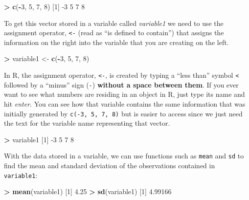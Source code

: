 \documentclass[]{book}
\newenvironment{Shaded}{\begin{snugshade}}{\end{snugshade}}
\newcommand{\DecValTok}[1]{\textcolor[rgb]{0.00,0.00,0.81}{#1}}
\newcommand{\FloatTok}[1]{\textcolor[rgb]{0.00,0.00,0.81}{#1}}
\newcommand{\KeywordTok}[1]{\textcolor[rgb]{0.13,0.29,0.53}{\textbf{#1}}}
\newcommand{\NormalTok}[1]{#1}
\newcommand{\OperatorTok}[1]{\textcolor[rgb]{0.81,0.36,0.00}{\textbf{#1}}}
\newcommand{\StringTok}[1]{\textcolor[rgb]{0.31,0.60,0.02}{#1}}
\renewenvironment{Shaded}{%
\setlength{\FrameRule}{1.5pt}
\def\FrameCommand{\fboxrule=\FrameRule\fboxsep=5pt 
                  \fcolorbox{framecolor}{shadecolor}}%
\MakeFramed {\FrameRestore}}%
{\endMakeFramed}
\begin{document}
\begin{Shaded}
\begin{Highlighting}[]
\OperatorTok{>}\StringTok{ }\KeywordTok{c}\NormalTok{(}\OperatorTok{-}\DecValTok{3}\NormalTok{, }\DecValTok{5}\NormalTok{, }\DecValTok{7}\NormalTok{, }\DecValTok{8}\NormalTok{)}
\NormalTok{[}\DecValTok{1}\NormalTok{] }\DecValTok{-3} \DecValTok{5} \DecValTok{7} \DecValTok{8}
\end{Highlighting}
\end{Shaded}

To get this vector stored in a variable called \emph{variable1} we need to
use the assignment operator, \texttt{\textless{}-} (read as ``is defined to contain'') that assigns
the information on the right into the variable that you are creating on
the left.

\begin{Shaded}
\begin{Highlighting}[]
\OperatorTok{>}\StringTok{ }\NormalTok{variable1 <-}\StringTok{ }\KeywordTok{c}\NormalTok{(}\OperatorTok{-}\DecValTok{3}\NormalTok{, }\DecValTok{5}\NormalTok{, }\DecValTok{7}\NormalTok{, }\DecValTok{8}\NormalTok{)}
\end{Highlighting}
\end{Shaded}

In R, the assignment operator, \texttt{\textless{}-}, is created by typing a
``less than'' symbol \texttt{\textless{}} followed by a ``minus'' sign (\texttt{-})
\textbf{without a space between them}. If you
ever want to see what numbers are residing in an object in R, just type
its name and hit \emph{enter}. You can see how that variable contains the same
information that was initially generated by
\texttt{c(-3,\ 5,\ 7,\ 8)} but is easier to access since we just need the text
for the variable name representing that vector.

\begin{Shaded}
\begin{Highlighting}[]
\OperatorTok{>}\StringTok{ }\NormalTok{variable1}
\NormalTok{[}\DecValTok{1}\NormalTok{] }\DecValTok{-3} \DecValTok{5} \DecValTok{7} \DecValTok{8}
\end{Highlighting}
\end{Shaded}

With the data stored in a variable, we can use functions such as
\texttt{mean} and
\texttt{sd} to find the mean and standard deviation of the observations contained in
\texttt{variable1}:

\begin{Shaded}
\begin{Highlighting}[]
\OperatorTok{>}\StringTok{ }\KeywordTok{mean}\NormalTok{(variable1)}
\NormalTok{[}\DecValTok{1}\NormalTok{] }\FloatTok{4.25}
\OperatorTok{>}\StringTok{ }\KeywordTok{sd}\NormalTok{(variable1)}
\NormalTok{[}\DecValTok{1}\NormalTok{] }\FloatTok{4.99166}
\end{Highlighting}
\end{Shaded}
\end{document}

